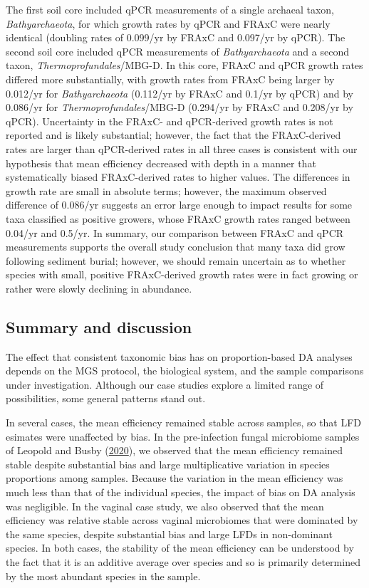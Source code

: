 \documentclass[
]{article}
\begin{document}
The first soil core included qPCR measurements of a single archaeal taxon, \emph{Bathyarchaeota}, for which growth rates by qPCR and FRAxC were nearly identical (doubling rates of 0.099/yr by FRAxC and 0.097/yr by qPCR).
The second soil core included qPCR measurements of \emph{Bathyarchaeota} and a second taxon, \emph{Thermoprofundales}/MBG-D.
In this core, FRAxC and qPCR growth rates differed more substantially, with growth rates from FRAxC being larger by 0.012/yr for \emph{Bathyarchaeota} (0.112/yr by FRAxC and 0.1/yr by qPCR) and by 0.086/yr for \emph{Thermoprofundales}/MBG-D (0.294/yr by FRAxC and 0.208/yr by qPCR).
Uncertainty in the FRAxC- and qPCR-derived growth rates is not reported and is likely substantial; however, the fact that the FRAxC-derived rates are larger than qPCR-derived rates in all three cases is consistent with our hypothesis that mean efficiency decreased with depth in a manner that systematically biased FRAxC-derived rates to higher values.
The differences in growth rate are small in absolute terms; however, the maximum observed difference of 0.086/yr suggests an error large enough to impact results for some taxa classified as positive growers, whose FRAxC growth rates ranged between 0.04/yr and 0.5/yr.
In summary, our comparison between FRAxC and qPCR measurements supports the overall study conclusion that many taxa did grow following sediment burial; however, we should remain uncertain as to whether species with small, positive FRAxC-derived growth rates were in fact growing or rather were slowly declining in abundance.

\hypertarget{summary-and-discussion}{%
\subsection{Summary and discussion}\label{summary-and-discussion}}

The effect that consistent taxonomic bias has on proportion-based DA analyses depends on the MGS protocol, the biological system, and the sample comparisons under investigation.
Although our case studies explore a limited range of possibilities, some general patterns stand out.

In several cases, the mean efficiency remained stable across samples, so that LFD esimates were unaffected by bias.
In the pre-infection fungal microbiome samples of Leopold and Busby (\protect\hyperlink{ref-leopold2020host}{2020}), we observed that the mean efficiency remained stable despite substantial bias and large multiplicative variation in species proportions among samples.
Because the variation in the mean efficiency was much less than that of the individual species, the impact of bias on DA analysis was negligible.
In the vaginal case study, we also observed that the mean efficiency was relative stable across vaginal microbiomes that were dominated by the same species, despite substantial bias and large LFDs in non-dominant species.
In both cases, the stability of the mean efficiency can be understood by the fact that it is an additive average over species and so is primarily determined by the most abundant species in the sample.
\end{document}
